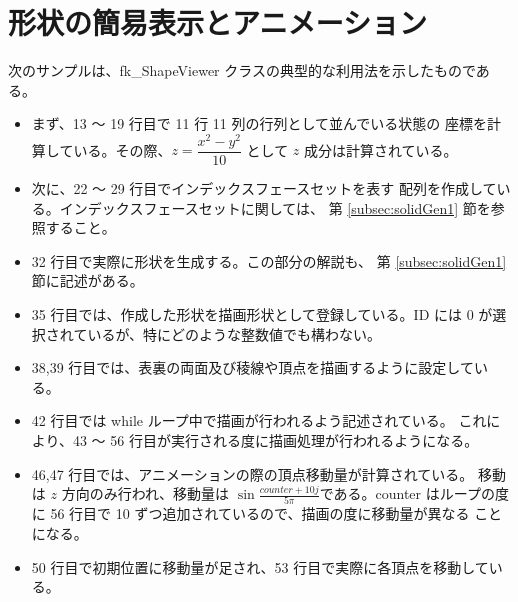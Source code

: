 \section{形状の簡易表示とアニメーション} \label{sec:sampleviewer}
次のサンプルは、fk\_ShapeViewer クラスの典型的な利用法を示したものである。
\begin{itemize}
 \item まず、13 〜 19 行目で 11 行 11 列の行列として並んでいる状態の
	座標を計算している。その際、\(z = \dfrac{x^2 - y^2}{10}\)
	として \(z\) 成分は計算されている。

 \item 次に、22 〜 29 行目でインデックスフェースセットを表す
	配列を作成している。インデックスフェースセットに関しては、
	第 \ref{subsec:solidGen1} 節を参照すること。

 \item 32 行目で実際に形状を生成する。この部分の解説も、
	第 \ref{subsec:solidGen1} 節に記述がある。

 \item 35 行目では、作成した形状を描画形状として登録している。ID には
	0 が選択されているが、特にどのような整数値でも構わない。

 \item 38,39 行目では、表裏の両面及び稜線や頂点を描画するように設定している。

 \item 42 行目では while ループ中で描画が行われるよう記述されている。
	これにより、43 〜 56 行目が実行される度に描画処理が行われるようになる。

 \item 46,47 行目では、アニメーションの際の頂点移動量が計算されている。
	移動は \(z\) 方向のみ行われ、移動量は
	\(\sin\frac{counter + 10j}{5\pi}\)である。counter はループの度に
	56 行目で 10 ずつ追加されているので、描画の度に移動量が異なる
	ことになる。

 \item 50 行目で初期位置に移動量が足され、53 行目で実際に各頂点を移動している。
\end{itemize}

